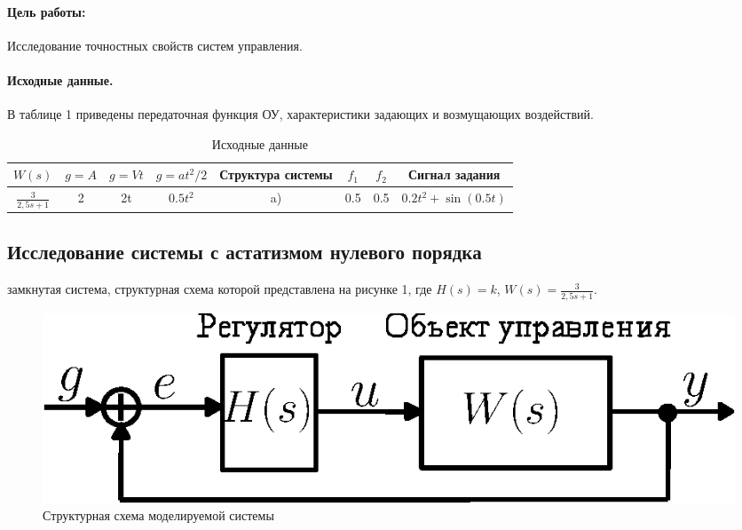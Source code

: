 \documentclass[12pt,a4paper]{article}
\begin{document}


\paragraph{Цель работы:}Исследование точностных свойств систем управления.%
\paragraph{Исходные данные.} В таблице 1 приведены передаточная функция ОУ, характеристики задающих и возмущающих воздействий.
\begin{table}[h!]
	\caption{Исходные данные}
	\renewcommand{\arraystretch}{1.8} %
	\begin{tabular}{|c|c|c|c|c|c|c|c|}
		\hline $W(s)$ & $g = A$ & $g = Vt$ & $g = at^2/2$ & Структура системы & $f_1$ & $f_2$ & Сигнал задания\\
		\hline $\displaystyle{\frac{3}{2,5s + 1}}$ & 2 & 2t & $0.5t^2$ & a) & 0.5 & 0.5 & $0.2t^2 + \sin{(0.5t)}$\\
		\hline
	\end{tabular}	
\end{table} 

\newpage
\begin{center}
\section{Исследование системы с астатизмом нулевого порядка}
\end{center}
 замкнутая система, структурная схема которой представлена на рисунке 1, где $H(s) = k$, $W(s)=\displaystyle{\frac{3}{2,5s + 1}}$.
\begin{figure}[h!]
	\centering
	\includegraphics[width=0.6\linewidth]{cxema0.eps}
	\caption{Структурная схема моделируемой системы}
\end{figure}
\end{document}
